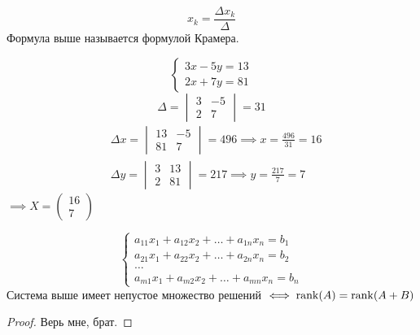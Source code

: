 \documentclass[12pt, a4paper]{article}
\begin{document}
\begin{exmp}
\[        \] 
        \[
            x_{k} = \frac{\Delta x_{k}}{\Delta}
        \] 
        Формула выше называется формулой Крамера.
    \end{exmp}
    \begin{exmp}
        \[
            \begin{cases}
                3x - 5y = 13 \\
                2x + 7y = 81
            \end{cases}
        \] 
        \[
            \Delta = \begin{vmatrix}
                3 & -5 \\ 2 & 7
            \end{vmatrix} = 31
        \]
        \begin{align*}
            & \Delta x = \begin{vmatrix}
                13 & -5 \\ 81 & 7
            \end{vmatrix} = 496 \implies x = \frac{496}{31} = 16 \\
            & \Delta y = \begin{vmatrix}
                3 & 13 \\ 2 & 81
            \end{vmatrix} = 217 \implies y = \frac{217}{7} = 7
        \end{align*} 
        \( \implies X = \begin{pmatrix}
            16 \\ 7
        \end{pmatrix} \)
        
    \end{exmp}
    \begin{theorem}
        \[
            \begin{cases}
                a_{11}x_{1} + a_{12}x_{2} + \ldots + a_{1n}x_{n} = b_{1} \\
                a_{21}x_{1} + a_{22}x_{2} + \ldots + a_{2n}x_{n} = b_{2} \\
                \ldots \\
                a_{m 1}x_{1} + a_{m 2}x_{2} + \ldots  + a_{mn}x_{n} = b_{n}
            \end{cases}
        \]Система выше имеет непустое множество решений \( \iff \operatorname{rank} (A) = \operatorname{rank}(A + B) \) 
    \end{theorem}
    \begin{proof}
        Верь мне, брат.
    \end{proof}
\end{document}
